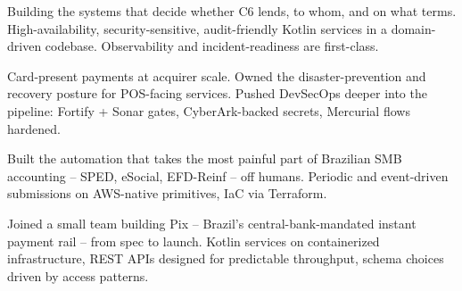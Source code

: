 \documentclass[10pt,a4paper,ragged2e]{altacv}
\begin{document}

\begin{fullwidth}\makecvheader\end{fullwidth}


Building the systems that decide whether C6 lends, to whom, and on what terms. High-availability, security-sensitive, audit-friendly Kotlin services in a domain-driven codebase. Observability and incident-readiness are first-class.

\divider

Card-present payments at acquirer scale. Owned the disaster-prevention and recovery posture for POS-facing services. Pushed DevSecOps deeper into the pipeline: Fortify + Sonar gates, CyberArk-backed secrets, Mercurial flows hardened.

\divider

Built the automation that takes the most painful part of Brazilian SMB accounting -- SPED, eSocial, EFD-Reinf -- off humans. Periodic and event-driven submissions on AWS-native primitives, IaC via Terraform.

\divider

Joined a small team building Pix -- Brazil's central-bank-mandated instant payment rail -- from spec to launch. Kotlin services on containerized infrastructure, REST APIs designed for predictable throughput, schema choices driven by access patterns.
\end{document}
